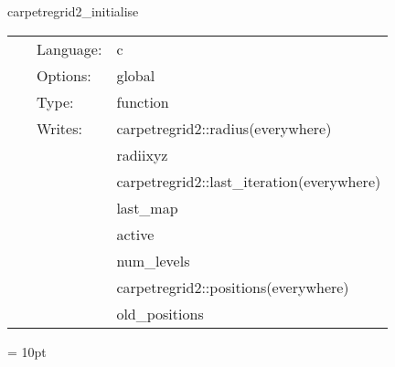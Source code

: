 \vspace{5mm}


\hspace{5mm} carpetregrid2\_initialise 

\hspace{5mm}{\it initialise locations of refined regions } 


\hspace{5mm}

 \begin{tabular*}{160mm}{cll} 
~ & Language:  & c \\ 
~ & Options:  & global \\ 
~ & Type:  & function \\ 
~ & Writes:  & carpetregrid2::radius(everywhere) \\ 
~& ~ &radiixyz\\ 
~& ~ &carpetregrid2::last\_iteration(everywhere)\\ 
~& ~ &last\_map\\ 
~& ~ &active\\ 
~& ~ &num\_levels\\ 
~& ~ &carpetregrid2::positions(everywhere)\\ 
~& ~ &old\_positions\\ 
\end{tabular*} 



\vspace{5mm}\parskip = 10pt 
